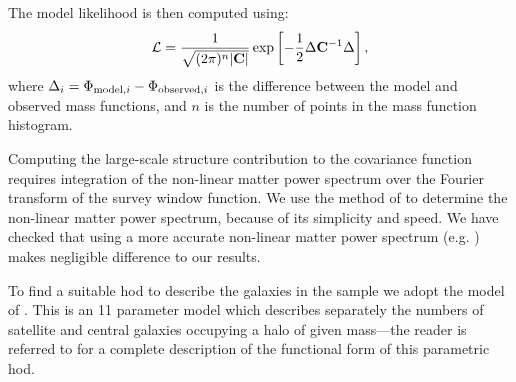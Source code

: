 The model likelihood is then computed using:
\begin{equation}
 \mathcal{L} = {1 \over \sqrt{(2 \pi)^n |{\bf C}|}} \exp\left[ -{1\over 2} \Delta {\bf C}^{-1} \Delta \right],
\end{equation}
where $\Delta_i = \Phi_{{\rm model}, i} - \Phi_{{\rm observed}, i}$ is the difference between the model and observed mass functions, and $n$ is the number of points in the mass function histogram.

Computing the large-scale structure contribution to the covariance function requires integration of the non-linear matter power spectrum over the Fourier transform of the survey window function. We use the method of \cite{peacock_non-linear_1996} to determine the non-linear matter power spectrum, because of its simplicity and speed. We have checked that using a more accurate non-linear matter power spectrum (e.g. \citealt{lawrence_coyote_2010}) makes negligible difference to our results.

To find a suitable \gls{hod} to describe the galaxies in the \cite{martin_arecibo_2010} sample we adopt the model of \cite{behroozi_comprehensive_2010}. This is an 11 parameter model which describes separately the numbers of satellite and central galaxies occupying a halo of given mass---the reader is referred to \cite{behroozi_comprehensive_2010} for a complete description of the functional form of this parametric \gls{hod}. 

